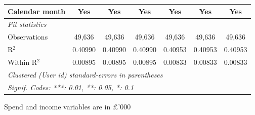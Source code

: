 \begin{table}[htbp]
\begin{threeparttable}[b]
\begin{tabular}{lcccccc}
         Calendar month          & Yes            & Yes            & Yes            & Yes            & Yes            & Yes\\  
         \midrule
         \emph{Fit statistics}\\
         Observations            & 49,636         & 49,636         & 49,636         & 49,636         & 49,636         & 49,636\\  
         R$^2$                   & 0.40990        & 0.40990        & 0.40990        & 0.40953        & 0.40953        & 0.40953\\  
         Within R$^2$            & 0.00895        & 0.00895        & 0.00895        & 0.00833        & 0.00833        & 0.00833\\  
         \midrule \midrule
         \multicolumn{7}{l}{\emph{Clustered (User id) standard-errors in parentheses}}\\
         \multicolumn{7}{l}{\emph{Signif. Codes: ***: 0.01, **: 0.05, *: 0.1}}\\
      \end{tabular}
      
      \begin{tablenotes}\footnotesize
         \item Spend and income variables are in £'000
      \end{tablenotes}
   \end{threeparttable}
\end{table}


